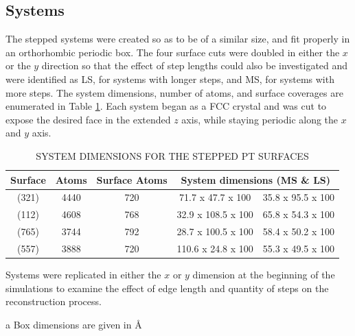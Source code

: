 \subsection{Systems}

The stepped  systems were created so as to be of a similar size, and fit
properly in an orthorhombic periodic box. The four surface cuts were doubled
in either the $x$ or the $y$ direction so that the effect of step lengths could
also be investigated and were identified as LS, for systems with longer steps,
and MS, for systems with more steps. The system dimensions, number of atoms,
and surface coverages are enumerated in Table \ref{tab:dimensions}. Each system
began as a FCC crystal and was cut to expose the desired face in the extended
$z$ axis, while staying periodic along the $x$ and $y$ axis.

\begin{table}
\caption{SYSTEM DIMENSIONS FOR THE STEPPED PT SURFACES}
\centering
\begin{threeparttable}
\centering
\begin{tabular}{c c c c c}
\hline\hline
Surface & Atoms & Surface Atoms & \multicolumn{2}{c}{System dimensions\tnote{a} (MS \& LS)}  \\ 
\hline
(321) & 4440 & 720 & 71.7 x 47.7 x 100 & 35.8 x 95.5 x 100  \\
(112) & 4608 & 768 & 32.9 x 108.5 x 100 & 65.8 x 54.3 x 100 \\
(765) & 3744 & 792 & 28.7 x 100.5 x 100 & 58.4 x 50.2 x 100 \\
(557) & 3888 & 720 & 110.6 x 24.8 x 100 & 55.3 x 49.5 x 100 \\
\hline
\hline
\end{tabular}
\begin{tablenotes}
  \item Systems were replicated in either the $x$ or $y$ dimension at the
beginning of the simulations to examine the effect of edge length and quantity
of steps on the reconstruction process.
  \item[a] Box dimensions are given in \AA
\end{tablenotes}
\end{threeparttable}
\label{tab:dimensions}
\end{table}

